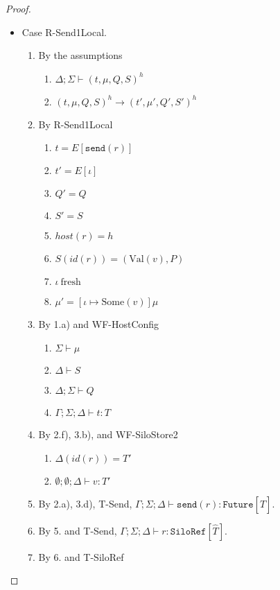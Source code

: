 \documentclass{article}
\theoremstyle{definition}
\newcommand{\Val}[1]{\text{Val}(#1)}
\begin{document}
\begin{proof}
\begin{itemize}
\item Case R-Send1Local.
\begin{enumerate}
\item By the assumptions
  \begin{enumerate}[label=(\alph*)]
  \item $\Delta ; \Sigma \vdash (t, \mu, Q, S)^h$
  \item $(t, \mu, Q, S)^h \longrightarrow (t', \mu', Q', S')^h$
  \end{enumerate}
\item By R-Send1Local
  \begin{enumerate}[label=(\alph*)]
  \item $t = E[\texttt{send}(r)]$
  \item $t' = E[\iota]$
  \item $Q' = Q$
  \item $S' = S$
  \item $host(r) = h$
  \item $S(id(r)) = ({\Val v}, P)$  %
  \item $\iota~\text{fresh}$
  \item $\mu' = [\iota \mapsto \text{Some}(v)]\mu$  %
  \end{enumerate}
\item By 1.a) and WF-HostConfig
  \begin{enumerate}[label=(\alph*)]
  \item $\Sigma \vdash \mu$
  \item $\Delta \vdash S$
  \item $\Delta ; \Sigma \vdash Q$
  \item $\Gamma ; \Sigma ; \Delta \vdash t : T$
  \end{enumerate}
\item By 2.f), 3.b), and WF-SiloStore2
  \begin{enumerate}[label=(\alph*)]
  \item $\Delta(id(r)) = T'$
  \item $\emptyset ; \emptyset ; \Delta \vdash v : T'$
  \end{enumerate}
\item By 2.a), 3.d), T-Send, $\Gamma ; \Sigma ; \Delta \vdash \texttt{send}(r) : \texttt{Future}[\hat{T}]$.
\item By 5. and T-Send, $\Gamma ; \Sigma ; \Delta \vdash r : \texttt{SiloRef}[\hat{T}]$.
\item By 6. and T-SiloRef
  \begin{enumerate}[label=(\alph*)]

\end{enumerate}
\end{enumerate}
\end{itemize}
\end{proof}
\end{document}
